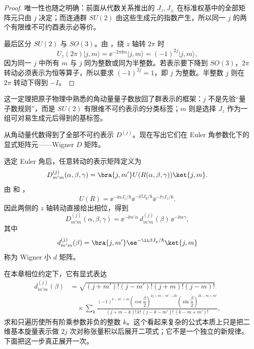 \begin{proof}
唯一性也随之明确：前面从代数关系推出的 $J_z,J_\pm$ 在标准权基中的全部矩阵元只由 $j$ 决定；而连通群 $SU(2)$ 由这些生成元的指数产生，所以同一 $j$ 的两个有限维不可约酉表示必等价。

最后区分 $SU(2)$ 与 $SO(3)$。由 ，绕 $z$ 轴转 $2\pi$ 时
\[
U_z(2\pi)\lvert j,m\rangle
=\ee^{-2\pi\ii m}\lvert j,m\rangle
=(-1)^{2j}\lvert j,m\rangle,
\]
因为同一 $j$ 中所有 $m$ 与 $j$ 同为整数或同为半整数。若表示要下降到 $SO(3)$，$2\pi$ 转动必须表示为恒等算子，所以要求 $(-1)^{2j}=1$，即 $j$ 为整数。半整数 $j$ 则在 $2\pi$ 转动下得到 $-I$。
\end{proof}

这一定理把原子物理中熟悉的角动量量子数放回了群表示的框架：$j$ 不是先验“量子数规则”，而是 $SU(2)$ 有限维不可约表示的分类标签；$m$ 则是选择 $J_z$ 作为一组可对易生成元后得到的基标签。

从角动量代数得到了全部不可约表示 $D^{(j)}$。现在写出它们在 Euler 角参数化下的显式矩阵元——Wigner $D$ 矩阵。

选定 Euler 角后，任意转动的表示矩阵定义为
\[
D^{(j)}_{m'm}(\alpha,\beta,\gamma)
=\bra{j,m'}U(R(\alpha,\beta,\gamma))\ket{j,m}.
\]
由  和 ，
\[
U(R)=
\ee^{-\ii\alpha J_z/\hbar}
\ee^{-\ii\beta J_y/\hbar}
\ee^{-\ii\gamma J_z/\hbar}.
\]
因此两侧的 $z$ 轴转动直接给出相位，得到
\begin{equation}
D^{(j)}_{m'm}(\alpha,\beta,\gamma)
=\ee^{-\ii m'\alpha}\,
 d^{(j)}_{m'm}(\beta)\,
 \ee^{-\ii m\gamma},
\label{eq:wigner-D-factorization}
\end{equation}
其中
\[
d^{(j)}_{m'm}(\beta)
=\bra{j,m'}\ee^{-\ii\beta J_y/\hbar}\ket{j,m}
\]
称为 Wigner 小 $d$ 矩阵。

在本章相位约定下，它有显式表达
\begin{align}
 d^{(j)}_{m'm}(\beta)
&=
\sqrt{(j+m')!(j-m')!(j+m)!(j-m)!}
\nonumber\\
&\quad\times
\sum_k
\frac{(-1)^{k-m'+m}
\left(\cos\dfrac\beta2\right)^{2j+m-m'-2k}
\left(\sin\dfrac\beta2\right)^{2k-m+m'}}
{(j+m-k)!\,k!\,(j-k-m')!\,(k-m+m')!},
\label{eq:wigner-small-d}
\end{align}
求和只遍历使所有阶乘参数非负的整数 $k$。这个看起来复杂的公式本质上只是把二维基本旋量表示做 $2j$ 次对称张量积以后展开二项式；它不是一个独立的新规律。下面把这一步真正展开一次。

